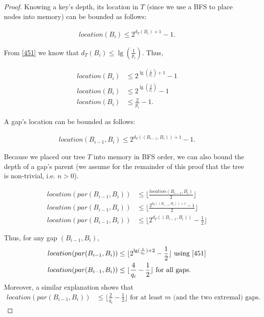 \documentclass[letterpaper,12pt,titlepage,oneside,final]{book}
\theoremstyle{plain}
\begin{document}
\begin{proof}
Knowing a key's depth, its location in $T$ (since we use a BFS to place nodes into memory) can be bounded as follows:

\begin{align*}
location(B_i) \leq 2^{d_T(B_i)+1}-1.
\end{align*}

From \ref{451} we know that $d_T(B_i) \leq \lg(\frac{1}{p_i})$. Thus,

\begin{align*}
location(B_i) &\leq 2^{\lg(\frac{1}{p_i})+1}-1 \\
location(B_i) &\leq 2^{\lg(\frac{2}{p_i})}-1 \\
location(B_i) &\leq \frac{2}{p_i}-1.
\end{align*}

A gap's location can be bounded as follows:

\begin{align*}
location(B_{i-1}, B_i) \leq 2^{d_T((B_{i-1},B_i))+1}-1.
\end{align*}

Because we placed our tree $T$ into memory in BFS order, we can also bound the depth of a gap's parent (we assume for the remainder of this proof that the tree is non-trivial, i.e. $n>0$).

\begin{align*}
location(par(B_{i-1}, B_i)) &\leq \lfloor \frac{location(B_{i-1}, B_i)}{2} \rfloor \\
location(par(B_{i-1}, B_i)) &\leq \lfloor \frac{2^{d_T((B_{i-1},B_i))+1}-1}{2} \rfloor \\
location(par(B_{i-1}, B_i)) &\leq \lfloor 2^{d_T((B_{i-1},B_i))}-\frac{1}{2} \rfloor
\end{align*}

Thus, for any gap $(B_{i-1},B_i)$,
\begin{align*}
location(par(B_{i-1},B_i)) &\leq \lfloor 2^{\lg(\frac{1}{q_i}) + 2}-\frac{1}{2} \rfloor \text{ using \ref{451}} \\
location(par(B_{i-1},B_i)) &\leq \lfloor \frac{4}{q_i}-\frac{1}{2} \rfloor \text{ for all gaps.}
\end{align*}
Moreover, a similar explanation shows that 
\begin{align*}
location(par(B_{i-1},B_i)) &\leq \lfloor \frac{2}{q_i}-\frac{1}{2} \rfloor \text{ for at least $m$ (and the two extremal) gaps.}
\end{align*}

\end{proof}
\end{document}
